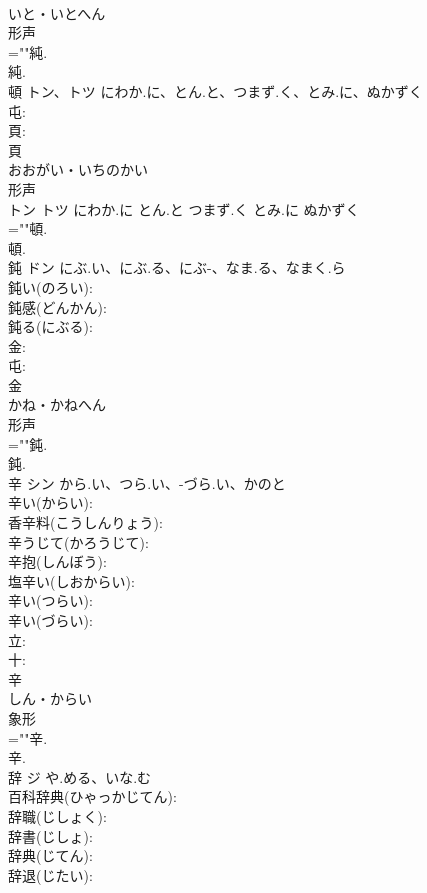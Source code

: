 \documentclass[8pt]{extreport}
\begin{document}
\begin{CJK}{UTF8}{min}
\\	いと・いとへん	
\\	形声 
\\	=""純.
\\	純.
\\	頓	トン、トツ	にわか.に、とん.と、つまず.く、とみ.に、ぬかずく		
\\	屯: 
\\	頁: 
\\	頁	
\\	おおがい・いちのかい	
\\	形声 
\\	トン トツ にわか.に とん.と つまず.く とみ.に ぬかずく 
\\	=""頓.
\\	頓.
\\	鈍	ドン	にぶ.い、にぶ.る、にぶ-、なま.る、なまく.ら		
\\	鈍い(のろい): 
\\	鈍感(どんかん): 
\\	鈍る(にぶる): 
\\	金: 
\\	屯: 
\\	金	
\\	かね・かねへん	
\\	形声 
\\	=""鈍.
\\	鈍.
\\	辛	シン	から.い、つら.い、-づら.い、かのと		
\\	辛い(からい): 
\\	香辛料(こうしんりょう): 
\\	辛うじて(かろうじて): 
\\	辛抱(しんぼう): 
\\	塩辛い(しおからい): 
\\	辛い(つらい): 
\\	辛い(づらい): 
\\	立: 
\\	十: 
\\	辛	
\\	しん・からい	
\\	象形 
\\	=""辛.
\\	辛.
\\	辞	ジ	や.める、いな.む		
\\	百科辞典(ひゃっかじてん): 
\\	辞職(じしょく): 
\\	辞書(じしょ): 
\\	辞典(じてん): 
\\	辞退(じたい): 

\end{CJK}
\end{document}
